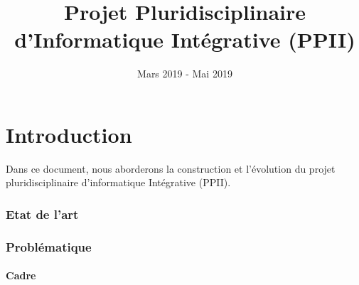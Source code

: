 \documentclass{article}
\title{Projet Pluridisciplinaire d'Informatique Intégrative (PPII)}
\author{
    Alexandre \textsc{\and}{Cesari}

    Pierre \textsc{}}{Bouillon}
\date{Mars 2019 - Mai 2019}
\begin{document}
\maketitle

\newpage


\tableofcontents{}

\newpage


\part*{Introduction}

Dans ce document, nous aborderons la construction et l'évolution du projet pluridisciplinaire d'informatique Intégrative (PPII).

\newpage


\section{Etat de l'art}\label{sec:etat-de-l'art}


\newpage


\section{Problématique}\label{sec:problématique}

\subsection{Cadre}\label{subsec:cadre}
\end{document}
